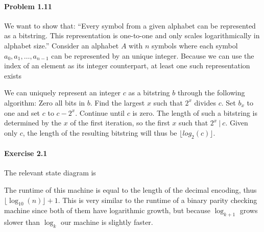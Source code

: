 \documentclass{article}
\begin{document}
\paragraph{Problem 1.11} We want to show that: \enquote{Every symbol from a given alphabet can be represented as a bitstring. This representation is one-to-one and only scales logarithmically in alphabet size.} Consider an alphabet $A$ with $n$ symbols where each symbol $a_0, a_1, \ldots, a_{n - 1}$ can be represented by an unique integer. Because we can use the index of an element as its integer counterpart, at least one such representation exists

We can uniquely represent an integer $c$ as a bitstring $b$ through the following algorithm: Zero all bits in $b$. Find the largest $x$ such that $2^x$ divides $c$. Set $b_x$ to one and set $c$ to $c - 2^x$. Continue until $c$ is zero. The length of such a bitstring is determined by the $x$ of the first iteration, so the first $x$ such that $2^x\ |\ c$. Given only $c$, the length of the resulting bitstring will thus be $\lfloor log_2(c) \rfloor$.

\paragraph{Exercise 2.1} The relevant state diagram is
\begin{center}
\end{center}
The runtime of this machine is equal to the length of the decimal encoding, thus $\lfloor \log_{10}(n) \rfloor + 1$. This is very similar to the runtime of a binary parity checking machine since both of them have logarithmic growth, but because $\log_{k + 1}$ grows slower than $\log_{k}$ our machine is slightly faster.
\end{document}
